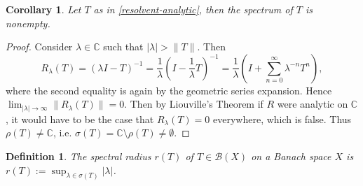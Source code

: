 \documentclass[12pt,oneside]{report}
\newtheorem{cor}[thm]{Corollary}
\newtheorem{defn}[thm]{Definition}
\begin{document}
\begin{cor}\label{spectrum-nonempty}
    Let $T$ as in \ref{resolvent-analytic}, then the spectrum of $T$ is nonempty.
\end{cor}
\begin{proof}
    Consider $\lambda \in \mathbb{C}$ such that $|\lambda| > \|T\|$. Then $$R_{\lambda}(T) = (\lambda I - T)^{-1} = \frac{1}{\lambda}\left( I - \frac{1}{\lambda}T \right)^{-1} = \frac{1}{\lambda}\left( I + \sum_{n=0}^{\infty} \lambda^{-n} T^{n} \right),$$ where the second equality is again by the geometric series expansion. Hence $\lim_{ |\lambda| \to \infty } \|R_{\lambda}(T)\| = 0$. Then by Liouville's Theorem if $R$ were analytic on $\mathbb{C}$, it would have to be the case that $R_{\lambda}(T) = 0$ everywhere, which is false. Thus $\rho(T) \neq \mathbb{C}$, i.e. $\sigma(T) = \mathbb{C} \setminus \rho(T) \neq \emptyset$.
\end{proof}

\begin{defn}
    The spectral radius $r(T)$ of $T \in \mathscr{B}(X)$ on a Banach space $X$ is $r(T) := \sup_{\lambda \in \sigma(T)} |\lambda|$.
\end{defn}
\end{document}
